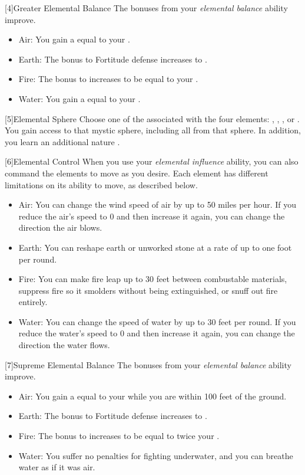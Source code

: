         [4]{Greater Elemental Balance} The bonuses from your \textit{elemental balance} ability improve.
        \begin{itemize}
            \item Air: You gain a  equal to your .
            \item Earth: The bonus to Fortitude defense increases to .
            \item Fire: The bonus to  increases to be equal to your .
            \item Water: You gain a  equal to your .
        \end{itemize}

        [5]{Elemental Sphere} Choose one of the  associated with the four elements: , , , or .
        You gain access to that mystic sphere, including all  from that sphere.
        In addition, you learn an additional nature .

        [6]{Elemental Control} When you use your \textit{elemental influence} ability, you can also command the elements to move as you desire.
        Each element has different limitations on its ability to move, as described below.
        \begin{itemize}
            \item Air: You can change the wind speed of air by up to 50 miles per hour.
                If you reduce the air's speed to 0 and then increase it again, you can change the direction the air blows.
            \item Earth: You can reshape earth or unworked stone at a rate of up to one foot per round.
            \item Fire: You can make fire leap up to 30 feet between combustable materials, suppress fire so it smolders without being extinguished, or snuff out fire entirely.
            \item Water: You can change the speed of water by up to 30 feet per round.
                If you reduce the water's speed to 0 and then increase it again, you can change the direction the water flows.
        \end{itemize}

        [7]{Supreme Elemental Balance} The bonuses from your \textit{elemental balance} ability improve.
        \begin{itemize}
            \item Air: You gain a  equal to your  while you are within 100 feet of the ground.
            \item Earth: The bonus to Fortitude defense increases to .
            \item Fire: The bonus to  increases to be equal to twice your .
            \item Water: You suffer no penalties for fighting underwater, and you can breathe water as if it was air.
        \end{itemize}

